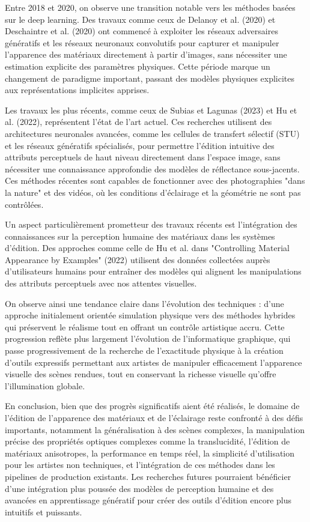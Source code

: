 \documentclass{article}
\begin{document}
Entre 2018 et 2020, on observe une transition notable vers les méthodes basées sur le deep learning. Des travaux comme ceux de Delanoy et al. (2020) et Deschaintre et al. (2020) ont commencé à exploiter les réseaux adversaires génératifs et les réseaux neuronaux convolutifs pour capturer et manipuler l'apparence des matériaux directement à partir d'images, sans nécessiter une estimation explicite des paramètres physiques. Cette période marque un changement de paradigme important, passant des modèles physiques explicites aux représentations implicites apprises.

Les travaux les plus récents, comme ceux de Subias et Lagunas (2023) et Hu et al. (2022), représentent l'état de l'art actuel. Ces recherches utilisent des architectures neuronales avancées, comme les cellules de transfert sélectif (STU) et les réseaux génératifs spécialisés, pour permettre l'édition intuitive des attributs perceptuels de haut niveau directement dans l'espace image, sans nécessiter une connaissance approfondie des modèles de réflectance sous-jacents. Ces méthodes récentes sont capables de fonctionner avec des photographies "dans la nature" et des vidéos, où les conditions d'éclairage et la géométrie ne sont pas contrôlées.

Un aspect particulièrement prometteur des travaux récents est l'intégration des connaissances sur la perception humaine des matériaux dans les systèmes d'édition. Des approches comme celle de Hu et al. dans "Controlling Material Appearance by Examples" (2022) utilisent des données collectées auprès d'utilisateurs humains pour entraîner des modèles qui alignent les manipulations des attributs perceptuels avec nos attentes visuelles.

On observe ainsi une tendance claire dans l'évolution des techniques : d'une approche initialement orientée simulation physique vers des méthodes hybrides qui préservent le réalisme tout en offrant un contrôle artistique accru. Cette progression reflète plus largement l'évolution de l'informatique graphique, qui passe progressivement de la recherche de l'exactitude physique à la création d'outils expressifs permettant aux artistes de manipuler efficacement l'apparence visuelle des scènes rendues, tout en conservant la richesse visuelle qu'offre l'illumination globale.

En conclusion, bien que des progrès significatifs aient été réalisés, le domaine de l'édition de l'apparence des matériaux et de l'éclairage reste confronté à des défis importants, notamment la généralisation à des scènes complexes, la manipulation précise des propriétés optiques complexes comme la translucidité, l'édition de matériaux anisotropes, la performance en temps réel, la simplicité d'utilisation pour les artistes non techniques, et l'intégration de ces méthodes dans les pipelines de production existants. Les recherches futures pourraient bénéficier d'une intégration plus poussée des modèles de perception humaine et des avancées en apprentissage génératif pour créer des outils d'édition encore plus intuitifs et puissants.
\end{document}
